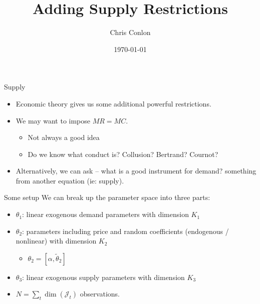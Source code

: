 \documentclass[xcolor=pdftex,dvipsnames,table,mathserif,aspectratio=169]{beamer}
\begin{document}
\title{Adding Supply Restrictions }
\author{Chris Conlon}
\date{\today}

\frame{\titlepage}

\begin{frame}{Supply}
\begin{itemize}
\item Economic theory gives us some additional powerful restrictions.
\item We may want to impose $MR = MC$.
\begin{itemize}
\item Not always a good idea
\item Do we know what conduct is? Collusion? Bertrand? Cournot?
\end{itemize}

\item Alternatively, we can ask -- what is a good instrument for demand? \alert{something from another equation} (ie: supply).
\end{itemize}
\end{frame}

\begin{frame}{Some setup}
We can break up the parameter space into three parts:
\begin{itemize}
\item $\theta_1$: linear exogenous demand parameters with dimension $K_1$
 \item $\theta_2$: parameters including price and random coefficients (endogenous / nonlinear) with dimension $K_2$
 \begin{itemize}
 \item $\theta_2 = [\alpha, \widetilde{\theta}_2]$
\end{itemize}
 \item $\theta_3$: linear exogenous supply parameters with dimension $K_3$
 \item $N = \sum_{t} \dim(\mathcal{J}_t)$ observations.
\end{itemize}
\end{frame}
\end{document}
